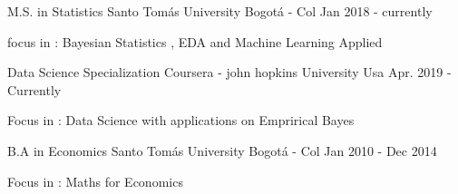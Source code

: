 

\begin{cventries}

  \cventry
    {M.S. in Statistics} %
    {Santo Tomás University} %
    {Bogotá - Col} %
    {Jan 2018 - currently } %
    {
      \begin{cvitems} %
        \item {focus in : Bayesian Statistics , EDA and Machine Learning Applied }
      \end{cvitems}
    }

  \cventry
    {Data Science Specialization} %
    {Coursera - john hopkins University} %
    {Usa} %
    {Apr. 2019 - Currently } %
    {
      \begin{cvitems} %
        \item {Focus in : Data Science with applications on Emprirical Bayes}
      \end{cvitems}
    }


  \cventry
    {B.A in Economics} %
    {Santo Tomás University} %
    {Bogotá - Col} %
    {Jan 2010 - Dec 2014} %
    {
      \begin{cvitems} %
        \item {Focus in : Maths for Economics }
      \end{cvitems}
    }

\end{cventries}
